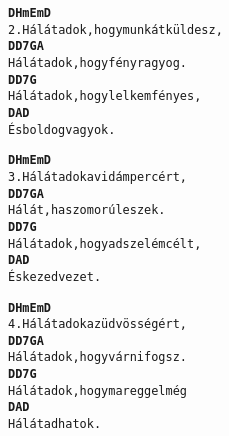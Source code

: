 \begin{minipage}{\textwidth}
\kottastart
{}
\kottaend
\begin{minipage}{\textwidth}
\begin{multicols}{2}
\begin{minipage}{\textwidth}
\begin{alltt}
\textbf{    D    Hm          Em     D}
2. Hálát adok, hogy munkát küldesz,
\textbf{    D    D7          G       A}
   Hálát adok, hogy fény ragyog.
\textbf{    D    D7          G}
   Hálát adok, hogy lelkem fényes,
\textbf{   D   A      D}
   És boldog vagyok.
\end{alltt}
\vspace{0.0cm}
\versszakspacing
\end{minipage}
\begin{minipage}{\textwidth}
\begin{alltt}
\textbf{    D    Hm      Em    D}
3. Hálát adok a vidám percért,
\textbf{    D      D7      G     A}
   Hálát, ha szomorú leszek.
\textbf{    D    D7         G}
   Hálát adok, hogy adsz elém célt,
\textbf{   D   A       D}
   És kezed vezet.
\end{alltt}
\vspace{0.0cm}
\versszakspacing
\end{minipage}
\begin{minipage}{\textwidth}
\begin{alltt}
\textbf{    D    Hm      Em    D}
4. Hálát adok az üdvösségért,
\textbf{    D    D7          G     A}
   Hálát adok, hogy várni fogsz.
\textbf{    D    D7          G}
   Hálát adok, hogy ma reggel még
\textbf{    D    A    D}
   Hálát adhatok.
\end{alltt}
\vspace{0.0cm}
\versszakspacing
\end{minipage}
\vspace{0.2cm}
\end{multicols}
\end{minipage}

\end{minipage}
~\vspace{1.0cm}
\newline

